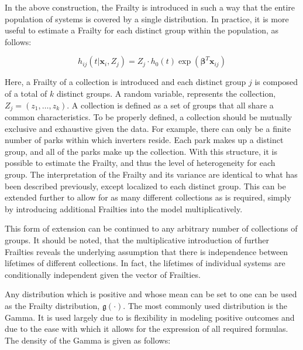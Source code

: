 In the above construction, the Frailty is introduced in such a way that the entire population of systems is covered by a single distribution. In practice, it is more useful to estimate a Frailty for each distinct group within the population, as follows:

$$ h_{ij}(t|\textbf{x}_i, Z_j) = Z_j \cdot h_0(t) \exp(\boldsymbol\beta^T \textbf{x}_{ij})  $$

Here, a Frailty of a collection is introduced and each distinct group $j$ is composed of a total of $k$ distinct groups. A random variable, represents the collection, $Z_j = (z_1, \dots, z_k)$. A collection is defined as a set of groups that all share a common characteristics. To be properly defined, a collection should be mutually exclusive and exhaustive given the data. For example, there can only be a finite number of parks within which inverters reside. Each park makes up a distinct group, and all of the parks make up the collection. With this structure, it is possible to estimate the Frailty, and thus the level of heterogeneity for each group. The interpretation of the Frailty and its variance are identical to what has been described previously, except localized to each distinct group. This can be extended further to allow for as many different collections as is required, simply by introducing additional Frailties into the model multiplicatively. 



This form of extension can be continued to any arbitrary number of collections of groups. It should be noted, that the multiplicative introduction of further Frailties reveals the underlying assumption that there is independence between lifetimes of different collections. In fact, the lifetimes of individual systems are conditionally independent given the vector of Frailties.



Any distribution which is positive and whose mean can be set to one can be used as the Frailty distribution, $\mathfrak{g}(\cdot)$. The most commonly used distribution is the Gamma. It is used largely due to is flexibility in modeling positive outcomes and due to the ease with which it allows for the expression of all required formulas\cite{Wienke2010}. The density of the Gamma is given as follows:

